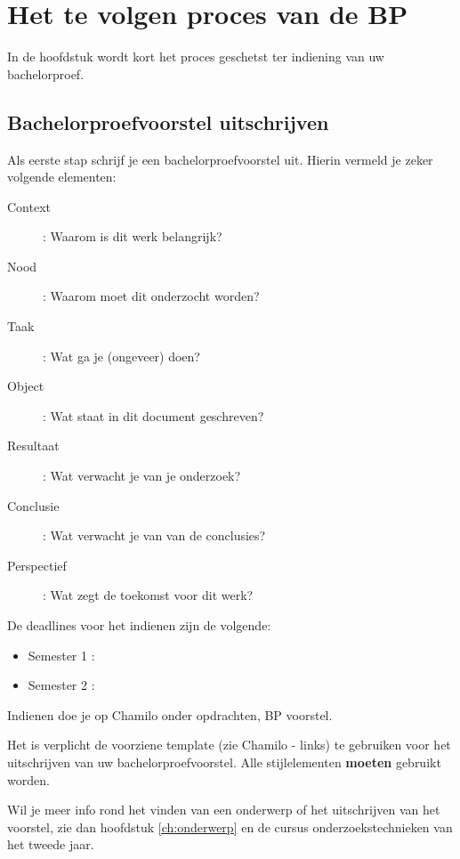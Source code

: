 \chapter{Het te volgen proces van de BP}

In de hoofdstuk wordt kort het proces geschetst ter indiening van uw bachelorproef. 




\section{Bachelorproefvoorstel uitschrijven}
\label{sec:bpuitschrijven}
Als eerste stap schrijf je een bachelorproefvoorstel uit. Hierin vermeld je zeker volgende elementen:

\begin{description}
	\item [Context]:  Waarom is dit werk belangrijk?
	\item [Nood] :  Waarom moet dit onderzocht worden?
	\item [Taak]:  Wat ga je (ongeveer) doen?
	\item [Object]: Wat staat in dit document geschreven?
	\item [Resultaat]: Wat verwacht je van je onderzoek?
	\item [Conclusie]: Wat verwacht je van van de conclusies?
	\item [Perspectief]: Wat zegt de toekomst voor dit werk?
\end{description}

De deadlines voor het indienen zijn de volgende:
\begin{framed}
	\begin{itemize}
		\item Semester 1 : \voorstelSemEen{}
		\item Semester 2 : \voorstelSemTwee{}
	\end{itemize}
\end{framed}

Indienen doe je op Chamilo onder opdrachten, BP voorstel.

\begin{framed}
	Het is verplicht de voorziene template (zie Chamilo - links) te gebruiken voor het uitschrijven van uw bachelorproefvoorstel. Alle stijlelementen \textbf{moeten} gebruikt worden.
\end{framed}

Wil je meer info rond het vinden van een onderwerp of het uitschrijven van het voorstel, zie dan hoofdstuk \ref{ch:onderwerp} en de cursus onderzoekstechnieken van het tweede jaar.

